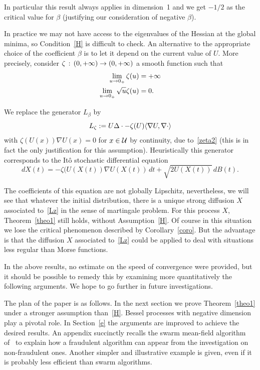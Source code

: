 \documentclass[AHL,Unicode,longabstracts,published]{cedram}
\newcommand{\cU}{\mathcal{U}}
\newcommand{\iy}{\infty}
\newcommand{\na}{\nabla}
\newcommand{\tr}{\Delta}
\let\originalleft\left
\let\originalright\right
\renewcommand{\left}{\mathopen{}\mathclose\bgroup\originalleft}
\renewcommand{\right}{\aftergroup\egroup\originalright}
\let\oldin\in
\renewcommand{\in}{\mathchoice{\oldin}{\oldin}{\,\oldin\,}{\,\oldin\,}}
\renewcommand*{\to}{\mathchoice{\longrightarrow}{\rightarrow}{\rightarrow}{\rightarrow}}
\begin{document}
In particular this result always applies in dimension~1 and we get $-1/2$ as the critical value for $\beta$ (justifying our consideration of negative $\beta$).

In practice we may not have access to the eigenvalues of the Hessian at the global minima, so Condition~\eqref{H} is difficult to check. An alternative to the appropriate choice of the coefficient $\beta$ is to let it depend on the current value of $U$. More precisely, consider $\zeta\,:\, (0,+\iy)\to (0,+\iy)$ a smooth function such that
\begin{align}
\lim_{u\to 0_+} \zeta(u)&= +\iy\label{zeta1}\\
\lim_{u\to 0_+} \sqrt{u}\zeta(u)&= 0.\label{zeta2}
\end{align}


We replace the generator $L_\beta$ by
\begin{equation}\label{Lz}
L_\zeta := U \tr \cdot-\zeta(U)\left\langle \na U,\na \cdot\right\rangle
\end{equation}
with $\zeta(U(x))\na U(x)=0$ for $x\in\cU$ by continuity, due to~\eqref{zeta2} (this is in fact the only justification for this assumption). Heuristically this generator corresponds to the Itô stochastic differential equation
\begin{equation*}
dX(t) = -\zeta(U(X(t))\na U(X(t))\, dt +\sqrt{2 U(X(t))}\, dB(t).
\end{equation*}


The coefficients of this equation are not globally Lipschitz, nevertheless, we will see that whatever the initial distribution, there is a unique strong diffusion $X$ associated to~\eqref{Lz} in the sense of martingale problem. For this process $X$, Theorem~\ref{theo1} still holds, without Assumption~\eqref{H}. Of course in this situation we lose the critical phenomenon described by Corollary~\ref{coro}. But the advantage is that the diffusion $X$ associated to~\eqref{Lz} could be applied to deal with situations less regular than Morse functions.


In the above results, no estimate on the speed of convergence were provided, but it should be possible to remedy this by examining more quantitatively the following arguments. We hope to go further in future investigations.


The plan of the paper is as follows. In the next section we prove Theorem~\ref{theo1} under a stronger assumption than~\eqref{H}. Bessel processes with negative dimension play a pivotal role. In Section~\ref{e} the arguments are improved to achieve the desired results. An appendix succinctly recalls the swarm mean-field algorithm of~\cite{https://doi.org/10.48550/arxiv.2204.01306} to explain how a fraudulent algorithm can appear from the investigation on non-fraudulent ones. Another simpler and illustrative example is given, even if it is probably less efficient than swarm algorithms.
\end{document}
